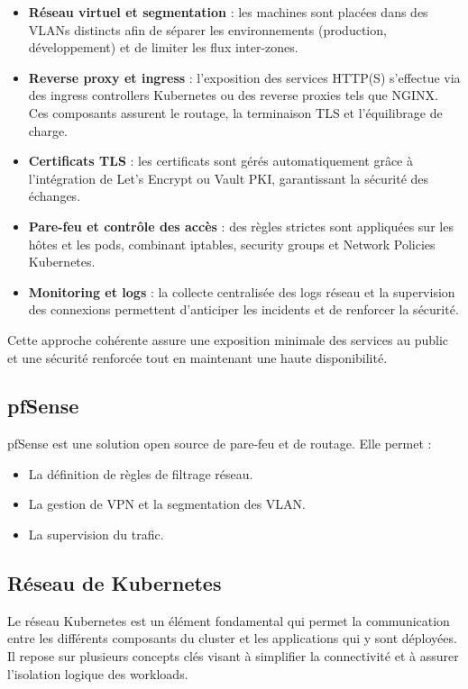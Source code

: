 \begin{itemize}
	\item \textbf{Réseau virtuel et segmentation} : les machines sont placées dans des VLANs distincts afin de séparer les environnements (production, développement) et de limiter les flux inter-zones.
	\item \textbf{Reverse proxy et ingress} : l’exposition des services HTTP(S) s’effectue via des ingress controllers Kubernetes ou des reverse proxies tels que NGINX. Ces composants assurent le routage, la terminaison TLS et l’équilibrage de charge.
	\item \textbf{Certificats TLS} : les certificats sont gérés automatiquement grâce à l’intégration de Let’s Encrypt ou Vault PKI, garantissant la sécurité des échanges.
	\item \textbf{Pare-feu et contrôle des accès} : des règles strictes sont appliquées sur les hôtes et les pods, combinant iptables, security groups et Network Policies Kubernetes.
	\item \textbf{Monitoring et logs} : la collecte centralisée des logs réseau et la supervision des connexions permettent d’anticiper les incidents et de renforcer la sécurité.
\end{itemize}

Cette approche cohérente assure une exposition minimale des services au public et une sécurité renforcée tout en maintenant une haute disponibilité.

\subsection{pfSense}

pfSense est une solution open source de pare-feu et de routage. Elle permet :
\begin{itemize}
	\item La définition de règles de filtrage réseau.
	\item La gestion de VPN et la segmentation des VLAN.
	\item La supervision du trafic.
\end{itemize}
\subsection{Réseau de Kubernetes}

Le réseau Kubernetes est un élément fondamental qui permet la communication entre les différents composants du cluster et les applications qui y sont déployées. Il repose sur plusieurs concepts clés visant à simplifier la connectivité et à assurer l’isolation logique des workloads.

